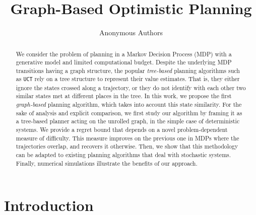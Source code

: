 \documentclass[runningheads]{llncs}
\begin{document}
\title{Graph-Based Optimistic Planning}
%
%
%
%

\author{Anonymous Authors}

%
\maketitle              %
%
\begin{abstract}
	We consider the problem of planning in a Markov Decision Process (MDP) with a generative model and limited computational budget. Despite the underlying MDP transitions having a graph structure, the popular \emph{tree-based} planning algorithms such as \texttt{UCT} rely on a tree structure to represent their value estimates. That is, they either ignore the states crossed along a trajectory, or they do not identify with each other two similar states met at different places in the tree. In this work, we propose the first \emph{graph-based} planning algorithm, which takes into account this state similarity. For the sake of analysis and explicit comparison, we first study our algorithm by framing it as a tree-based planner acting on the {unrolled} graph, in the simple case of deterministic systems. We provide a regret bound that depends on a novel problem-dependent measure of difficulty. This measure improves on the previous one in MDPs where the trajectories overlap, and recovers it otherwise. Then, we show that this methodology can be adapted to existing planning algorithms that deal with stochastic systems. Finally, numerical simulations illustrate the benefits of our approach.
	
\end{abstract}
%
%
%

\section{Introduction}
\end{document}
